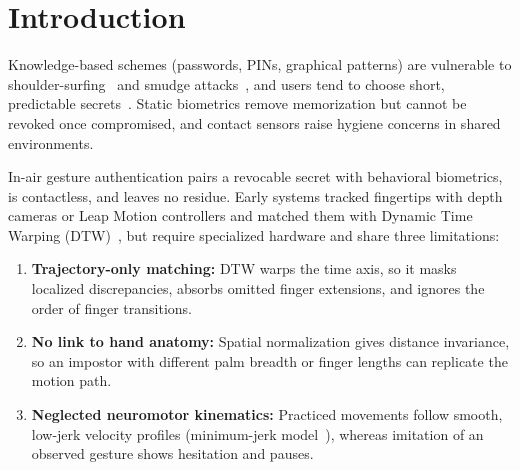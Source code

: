 \documentclass[conference]{IEEEtran}
\begin{document}
\section{Introduction}

Knowledge-based schemes (passwords, PINs, graphical patterns) are vulnerable to shoulder-surfing~\cite{tari2006} and smudge attacks~\cite{aviv2010}, and users tend to choose short, predictable secrets~\cite{vonzezschwitz2013}. Static biometrics remove memorization but cannot be revoked once compromised, and contact sensors raise hygiene concerns in shared environments.

In-air gesture authentication pairs a revocable secret with behavioral biometrics, is contactless, and leaves no residue. Early systems tracked fingertips with depth cameras or Leap Motion controllers and matched them with Dynamic Time Warping (DTW)~\cite{airauth,leappassword,dtwknn,inairsig,sakoe1978}, but require specialized hardware and share three limitations:

\begin{enumerate}
\item \textbf{Trajectory-only matching:} DTW warps the time axis, so it masks localized discrepancies, absorbs omitted finger extensions, and ignores the order of finger transitions.
\item \textbf{No link to hand anatomy:} Spatial normalization gives distance invariance, so an impostor with different palm breadth or finger lengths can replicate the motion path.
\item \textbf{Neglected neuromotor kinematics:} Practiced movements follow smooth, low-jerk velocity profiles (minimum-jerk model~\cite{flash1985}), whereas imitation of an observed gesture shows hesitation and pauses.
\end{enumerate}
\end{document}
